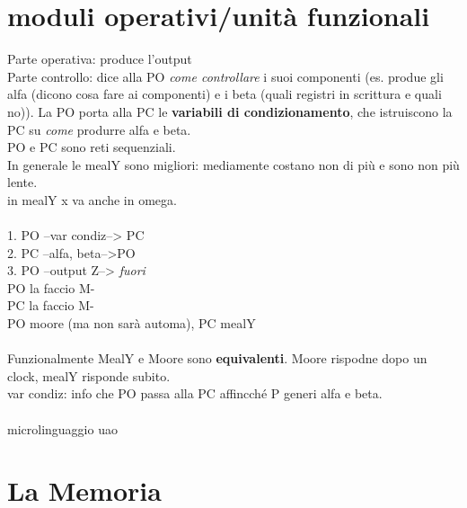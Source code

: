 \documentclass[10pt]{report}
\begin{document}
\section{moduli operativi/unità funzionali}
Parte operativa: produce l'output\\
Parte controllo: dice alla PO \textit{come controllare} i suoi componenti (es. produe gli alfa (dicono cosa fare ai componenti) e i beta (quali registri in scrittura e quali no)). La PO porta alla PC le \textbf{variabili di condizionamento}, che istruiscono la PC su \textit{come} produrre alfa e beta.\\
PO e PC sono reti sequenziali.\\
In generale le mealY sono migliori: mediamente costano non di più e sono non più lente.\\
in mealY x va anche in omega.\\\\
1. PO --var condiz--> PC\\2. PC --alfa, beta-->PO\\3. PO --output Z--> \textit{fuori}\\
PO la faccio M-\\
PC la faccio M-\\
PO moore (ma non sarà automa), PC mealY\\\\
Funzionalmente MealY e Moore sono \textbf{equivalenti}. Moore rispodne dopo un clock, mealY risponde subito.\\
var condiz: info che PO passa alla PC affincché P generi alfa e beta.\\\\
microlinguaggio uao\\
\section{La Memoria}
\end{document}
